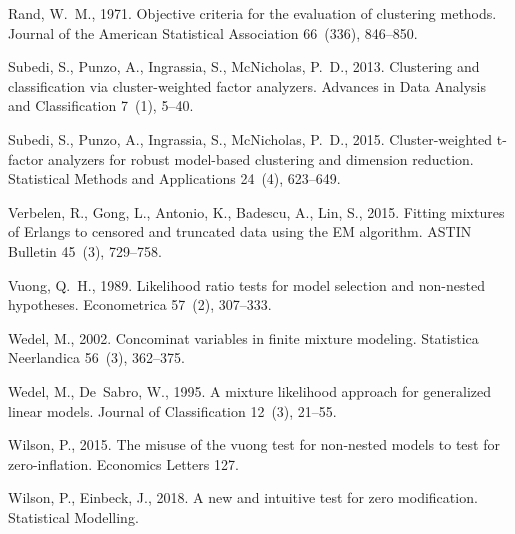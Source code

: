 \documentclass[12pt,letterpaper]{article}
\numberwithin{equation}{section}
\numberwithin{equation}{section}
\numberwithin{equation}{section}
\begin{document}
\begin{thebibliography}{36}
Rand, W.~M., 1971. Objective criteria for the evaluation of clustering methods.
  Journal of the American Statistical Association 66~(336), 846--850.

Subedi, S., Punzo, A., Ingrassia, S., McNicholas, P.~D., 2013. Clustering and
  classification via cluster-weighted factor analyzers. Advances in Data
  Analysis and Classification 7~(1), 5--40.

Subedi, S., Punzo, A., Ingrassia, S., McNicholas, P.~D., 2015. Cluster-weighted
  t-factor analyzers for robust model-based clustering and dimension reduction.
  Statistical Methods and Applications 24~(4), 623--649.

Verbelen, R., Gong, L., Antonio, K., Badescu, A., Lin, S., 2015. Fitting
  mixtures of {E}rlangs to censored and truncated data using the {EM}
  algorithm. ASTIN Bulletin 45~(3), 729--758.

Vuong, Q.~H., 1989. Likelihood ratio tests for model selection and non-nested
  hypotheses. Econometrica 57~(2), 307--333.

Wedel, M., 2002. Concominat variables in finite mixture modeling. Statistica
  Neerlandica 56~(3), 362--375.

Wedel, M., De~Sabro, W., 1995. A mixture likelihood approach for generalized
  linear models. Journal of Classification 12~(3), 21--55.

Wilson, P., 2015. The misuse of the vuong test for non-nested models to test
  for zero-inflation. Economics Letters 127.

Wilson, P., Einbeck, J., 2018. A new and intuitive test for zero modification.
  Statistical Modelling.

\end{thebibliography}
\end{document}
